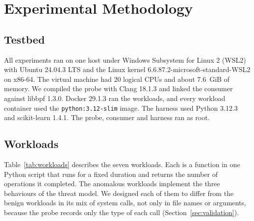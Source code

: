 \section{Experimental Methodology}
\label{sec:method}

\subsection{Testbed}

All experiments ran on one host under Windows Subsystem for Linux 2 (WSL2) with Ubuntu 24.04.3 LTS and the Linux kernel 6.6.87.2-microsoft-standard-WSL2 on x86-64. The virtual machine had 20 logical CPUs and about 7.6~GiB of memory. We compiled the probe with Clang 18.1.3 and linked the consumer against libbpf 1.3.0. Docker 29.1.3 ran the workloads, and every workload container used the \texttt{python:3.12-slim} image. The harness used Python 3.12.3 and scikit-learn 1.4.1. The probe, consumer and harness ran as root.

\subsection{Workloads}

Table~\ref{tab:workloads} describes the seven workloads. Each is a function in one Python script that runs for a fixed duration and returns the number of operations it completed. The anomalous workloads implement the three behaviours of the threat model. We designed each of them to differ from the benign workloads in its mix of system calls, not only in file names or arguments, because the probe records only the type of each call (Section~\ref{sec:validation}).

